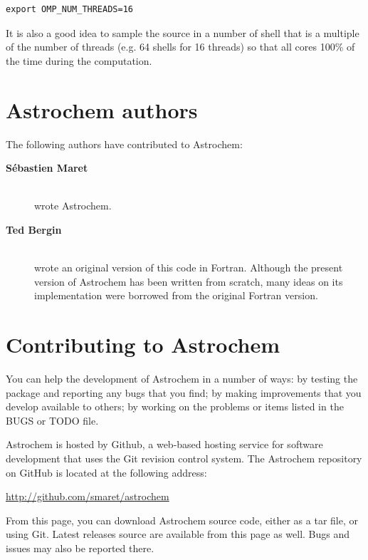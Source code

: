 \documentclass[a4paper,12pt]{article}
\begin{document}
\begin{verbatim}
export OMP_NUM_THREADS=16
\end{verbatim}

\noindent
It is also a good idea to sample the source in a number of shell that
is a multiple of the number of threads (e.g. 64 shells for 16 threads)
so that all cores 100\% of the time during the computation.




\newpage
\appendix

\section{Astrochem authors}
\label{sec:astrochem-authors}

The following authors have contributed to Astrochem:

\begin{description}

\item[{\bf S\'ebastien Maret}] \hfill \\
  wrote Astrochem.

\item[{\bf Ted Bergin}] \hfill \\
  wrote an original version of this code in Fortran. Although the
  present version of Astrochem has been written from scratch, many
  ideas on its implementation were borrowed from the original Fortran
  version.

\end{description}

\section{Contributing to Astrochem}
\label{sec:contr-astr}

You can help the development of Astrochem in a number of ways: by
testing the package and reporting any bugs that you find; by making
improvements that you develop available to others; by working on the
problems or items listed in the BUGS or TODO file.

Astrochem is hosted by Github, a web-based hosting service for
software development that uses the Git revision control system. The
Astrochem repository on GitHub is located at the following address:

\noindent
\url{http://github.com/smaret/astrochem}

\noindent
From this page, you can download Astrochem source code, either as a
tar file, or using Git. Latest releases source are available from this
page as well. Bugs and issues may also be reported there.
\end{document}
